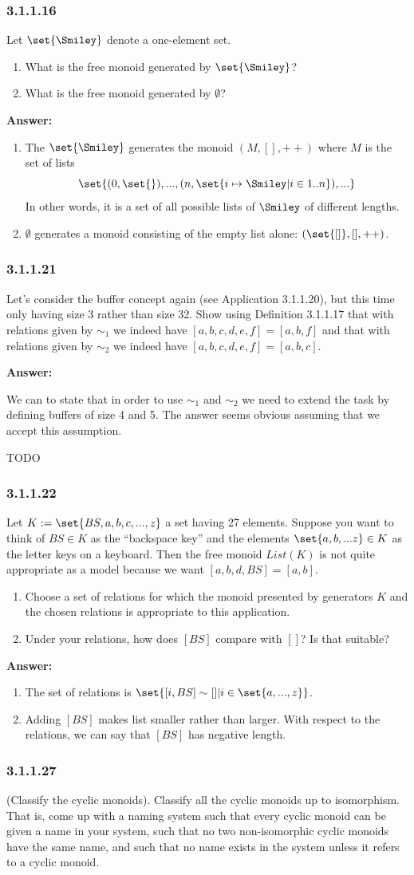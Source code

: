 \documentclass{article}
\newcommand{\vsp}[0]{\vspace*{10pt}\par}
\newcommand{\exercise}[1]{\subsubsection*{#1}}
\newcommand{\ans}[0]{\vsp\textbf{Answer: }\vsp}
\newcommand{\ei}{\item}
\newcommand{\es}{\begin{enumerate}[label=(\alph*)]\ei}
\newcommand{\ee}{\end{enumerate}}
\begin{document}
\exercise{3.1.1.16}

Let $\set{\Smiley}$ denote a one-element set.

\es What is the free monoid generated by $\set{\Smiley}$?
\ei What is the free monoid generated by $\emptyset$?
\ee

\ans

\es The $\set{\Smiley}$ generates the monoid $(M,[],++)$ where $M$ is the set of
    lists \[\set{(0,\set{}), ..., (n,\set{i \mapsto \Smiley | i \in {1..n}}),
    ...}\] In other words, it is a set of all possible lists of $\Smiley$ of
    different lengths.
\ei $\emptyset$ generates a monoid consisting of the empty list alone:
    $(\set{[]}, [], ++)$.
\ee

\exercise{3.1.1.21}

Let's consider the buffer concept again (see Application 3.1.1.20), but this
time only having size 3 rather than size 32. Show using Definition 3.1.1.17 that
with relations given by $\sim_1$ we indeed have $[a, b, c, d, e, f] = [a, b, f]$
and that with relations given by $\sim_2$ we indeed have $[a, b, c, d, e, f] =
[a, b, c]$.

\ans

We can to state that in order to use $\sim_1$ and $\sim_2$ we need to extend the
task by defining buffers of size 4 and 5. The answer seems obvious assuming that
we accept this assumption.

TODO

\exercise{3.1.1.22}

Let $K := \set{BS, a, b, c, ... , z}$ a set having 27 elements. Suppose you want
to think of $BS \in K$ as the “backspace key” and the elements $\set{a, b, ...
z} \in K$ as the letter keys on a keyboard. Then the free monoid $List(K)$ is
not quite appropriate as a model because we want $[a, b, d, BS] = [a, b]$.

\es Choose a set of relations for which the monoid presented by generators $K$
    and the chosen relations is appropriate to this application.
\ei Under your relations, how does $[BS]$ compare with $[]$? Is that suitable?
\ee

\ans


\es The set of relations is $\set{[i,BS] \sim [] | i \in \set{a,..., z}}$.
\ei Adding $[BS]$ makes list smaller rather than larger. With respect to the
    relations, we can say that $[BS]$ has negative length.
\ee

\exercise{3.1.1.27}

(Classify the cyclic monoids). Classify all the cyclic monoids up to
isomorphism. That is, come up with a naming system such that every cyclic monoid
can be given a name in your system, such that no two non-isomorphic cyclic
monoids have the same name, and such that no name exists in the system unless it
refers to a cyclic monoid.
\end{document}
